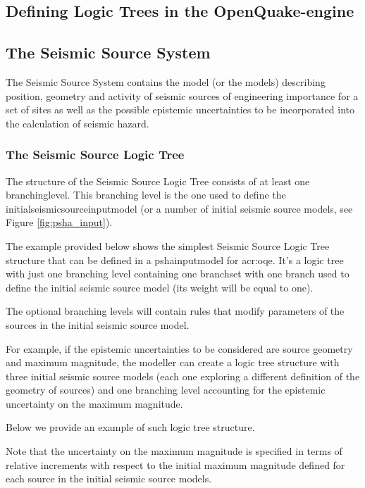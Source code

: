 \subsection{Defining Logic Trees in the OpenQuake-engine}

\subsection{The Seismic Source System}
The Seismic Source System contains the model (or the models) describing 
position, geometry 
and activity of seismic sources of engineering importance for a set of sites
as well as the possible epistemic uncertainties to be incorporated into the 
calculation of seismic hazard.
%
\subsubsection{The Seismic Source Logic Tree}
The structure of the Seismic Source Logic Tree consists of at least one 
\gls{branchinglevel}. This branching level is the one used to define the 
\gls{initialseismicsourceinputmodel} (or a number of initial seismic source 
models, see Figure \ref{fig:psha_input}).

The example provided below shows the simplest Seismic Source Logic Tree 
structure that can be defined in a \gls{pshainputmodel} for \gls{acr:oqe}. 
It's a logic tree with just one branching level containing 
one \gls{branchset} with one branch used to define the initial seismic source 
model (its weight will be equal to one).


The optional branching levels will contain rules that modify parameters 
of the sources in the initial seismic source model.

For example, if the epistemic uncertainties to be considered are
source geometry and maximum magnitude, the modeller can create a logic tree
structure with three initial seismic source models (each one exploring a 
different definition of the geometry of sources) and one branching level 
accounting for the epistemic uncertainty on the maximum magnitude.

Below we provide an example of such logic tree structure.

Note that the uncertainty on the maximum magnitude is specified in terms 
of relative increments with respect to the initial maximum magnitude 
defined for each source in the initial seismic source models.
%
